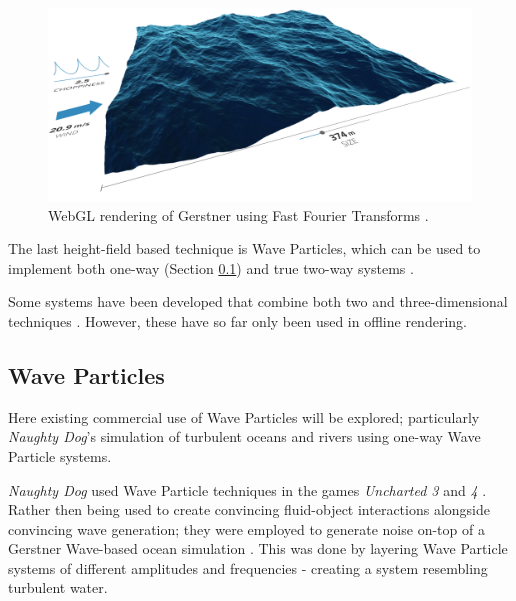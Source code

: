 \documentclass[12pt,a4paper,twoside]{report}
\begin{document}
\begin{figure}[h]
\centering
\includegraphics[width=0.8\linewidth]{gerstner_example}
\caption{WebGL rendering of Gerstner using Fast Fourier Transforms
\cite{DavidLiFFT}.}
\label{fig:gerstner_example}
\end{figure}

The last height-field based technique is Wave Particles, which can be used to
implement both one-way (Section \ref{sec:related_wave_particles}) and true
two-way systems \cite{Yuksel2007}.

Some systems have been developed that combine both two and three-dimensional
techniques \cite{Irving:2006:ESL:1179352.1141959}. However, these have so far
only been used in offline rendering.


\subsection{Wave Particles}
\label{sec:related_wave_particles}

Here existing commercial use of Wave Particles will be explored; particularly
\emph{Naughty Dog}'s simulation of turbulent oceans and rivers using one-way
Wave Particle systems.

\emph{Naughty Dog} used Wave Particle techniques in the games \emph{Uncharted
3} and \emph{4} \cite{Tatarchuk:2016:ARR:2897826.2940291}
\cite{OchoaAndHolder2012}. Rather then being used to create convincing
fluid-object interactions alongside convincing wave generation; they were
employed to generate noise on-top of a Gerstner Wave-based ocean simulation
\cite{Tessendorf2001}. This was done by layering Wave Particle systems of
different amplitudes and frequencies - creating a system resembling turbulent
water.
\end{document}

